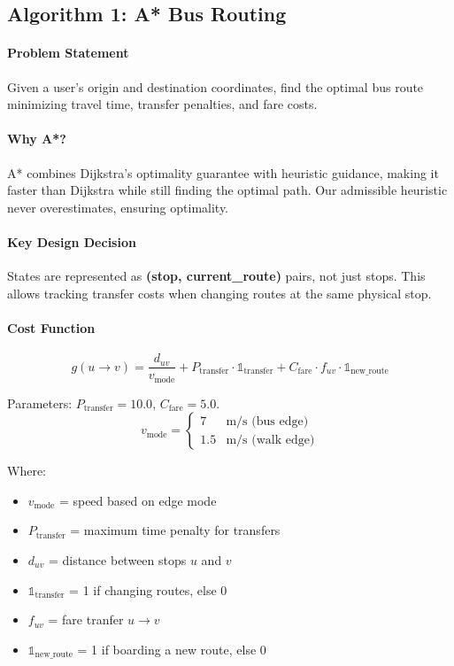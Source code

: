 \subsection{Algorithm 1: A* Bus Routing}

\paragraph{Problem Statement}
Given a user's origin and destination coordinates, find the optimal bus route minimizing travel time, transfer penalties, and fare costs.

\paragraph{Why A*?}
A* combines Dijkstra's optimality guarantee with heuristic guidance, making it faster than Dijkstra while still finding the optimal path. Our admissible heuristic never overestimates, ensuring optimality.

\paragraph{Key Design Decision}
States are represented as \textbf{(stop, current\_route)} pairs, not just stops. This allows tracking transfer costs when changing routes at the same physical stop.

\paragraph{Cost Function}
\begin{equation}
    g(u \rightarrow v) = \frac{d_{uv}}{v_{\text{mode}}} + P_{\text{transfer}} \cdot \mathbb{1}_{\text{transfer}} + C_{\text{fare}} \cdot f_{uv} \cdot \mathbb{1}_{\text{new\_route}}
\end{equation}

Parameters: $P_{\text{transfer}} = 10.0$, $C_{\text{fare}} = 5.0$.
\[
v_{\text{mode}} =
\begin{cases}
    7 & \text{m/s (bus edge)}\\
    1.5 & \text{m/s (walk edge)}
\end{cases}
\]

Where: 
\begin{itemize}[noitemsep]
    \item $v_{\text{mode}}$ = speed based on edge mode
    \item $P_{\text{transfer}}$ = maximum time penalty for transfers
    \item $d_{uv}$ = distance between stops $u$ and $v$
    \item $\mathbb{1}_{\text{transfer}}$ = 1 if changing routes, else 0
    \item $f_{uv}$ = fare tranfer $u \rightarrow v$
    \item $\mathbb{1}_{\text{new\_route}}$ = 1 if boarding a new route, else 0
\end{itemize}

